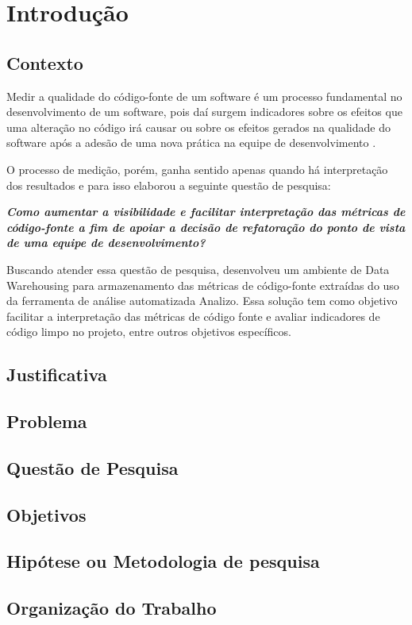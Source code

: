 \chapter{Introdução}

\section{Contexto}

Medir a qualidade do código-fonte  de um software é um processo fundamental no desenvolvimento de um software, pois daí surgem indicadores sobre os efeitos que uma alteração no código irá causar ou sobre os efeitos gerados na qualidade do software após a adesão de uma nova prática na equipe de desenvolvimento \cite{Fenton98}.

O processo de medição, porém, ganha sentido apenas quando há interpretação dos resultados e para isso  elaborou a seguinte questão de pesquisa: 

\textit{\textbf{Como aumentar a
visibilidade e facilitar interpretação das 
métricas de código-fonte
a fim de apoiar a decisão de refatoração
do ponto de vista de uma equipe de desenvolvimento?}}

Buscando atender essa questão de pesquisa,  desenvolveu um ambiente de Data Warehousing para armazenamento das métricas de código-fonte extraídas do uso da ferramenta de análise  automatizada Analizo. Essa solução tem como objetivo facilitar a interpretação das métricas de código fonte e avaliar indicadores de código limpo no projeto, entre outros objetivos específicos.

\section{Justificativa}

\section{Problema}

\section{Questão de Pesquisa}

\section{Objetivos}

\section{Hipótese ou Metodologia de pesquisa}

\section{Organização do Trabalho}
